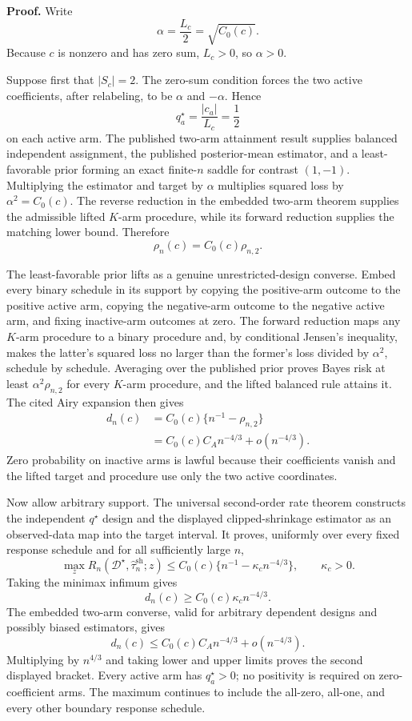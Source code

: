 \textbf{Proof.}
Write
\[
 \alpha=\frac{L_c}{2}=\sqrt{C_0(c)}.
\]
Because \(c\) is nonzero and has zero sum, \(L_c>0\), so \(\alpha>0\).

Suppose first that \(|S_c|=2\).  The zero-sum condition forces the two active coefficients, after relabeling, to be \(\alpha\) and \(-\alpha\).  Hence
\[
 q_a^\star=\frac{|c_a|}{L_c}=\frac12
\]
on each active arm.  The published two-arm attainment result supplies balanced independent assignment, the published posterior-mean estimator, and a least-favorable prior forming an exact finite-\(n\) saddle for contrast \((1,-1)\).  Multiplying the estimator and target by \(\alpha\) multiplies squared loss by \(\alpha^2=C_0(c)\).  The reverse reduction in the embedded two-arm theorem supplies the admissible lifted \(K\)-arm procedure, while its forward reduction supplies the matching lower bound.  Therefore
\[
 \rho_n(c)=C_0(c)\rho_{n,2}.
\]

The least-favorable prior lifts as a genuine unrestricted-design converse.  Embed every binary schedule in its support by copying the positive-arm outcome to the positive active arm, copying the negative-arm outcome to the negative active arm, and fixing inactive-arm outcomes at zero.  The forward reduction maps any \(K\)-arm procedure to a binary procedure and, by conditional Jensen's inequality, makes the latter's squared loss no larger than the former's loss divided by \(\alpha^2\), schedule by schedule.  Averaging over the published prior proves Bayes risk at least \(\alpha^2\rho_{n,2}\) for every \(K\)-arm procedure, and the lifted balanced rule attains it.  The cited Airy expansion then gives
\[
 \begin{aligned}
 d_n(c)
 &=C_0(c)\{n^{-1}-\rho_{n,2}\}\\
 &=C_0(c)C_A n^{-4/3}+o(n^{-4/3}).
 \end{aligned}
\]
Zero probability on inactive arms is lawful because their coefficients vanish and the lifted target and procedure use only the two active coordinates.

Now allow arbitrary support.  The universal second-order rate theorem constructs the independent \(q^\star\) design and the displayed clipped-shrinkage estimator as an observed-data map into the target interval.  It proves, uniformly over every fixed response schedule and for all sufficiently large \(n\),
\[
 \max_z R_n(\mathcal D^\star,\widehat\tau_n^{\mathrm{sh}};z)
 \leq C_0(c)\{n^{-1}-\kappa_cn^{-4/3}\},
 \qquad \kappa_c>0.
\]
Taking the minimax infimum gives
\[
 d_n(c)\geq C_0(c)\kappa_cn^{-4/3}.
\]
The embedded two-arm converse, valid for arbitrary dependent designs and possibly biased estimators, gives
\[
 d_n(c)\leq C_0(c)C_A n^{-4/3}+o(n^{-4/3}).
\]
Multiplying by \(n^{4/3}\) and taking lower and upper limits proves the second displayed bracket.  Every active arm has \(q_a^\star>0\); no positivity is required on zero-coefficient arms.  The maximum continues to include the all-zero, all-one, and every other boundary response schedule.

